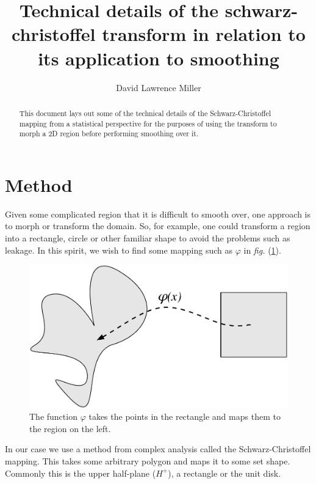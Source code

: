 \documentclass[a4paper,10pt]{amsart}
\title{Technical details of the schwarz-christoffel transform in relation to its application to smoothing}
\author{David Lawrence Miller}
\newcommand{\sch}{Schwarz-Christoffel }
\newcommand{\fig}[1]{\emph{fig.} (\ref{#1})}
\renewcommand{\phi}{\varphi}
\begin{document}
 
\begin{abstract}
This document lays out some of the technical details of the \sch mapping from a statistical perspective for the purposes of using the transform to morph a 2D region before performing smoothing over it. 
\end{abstract}
 
 
\newtheorem{thm}{Theorem}[section]
 
\newtheorem{defn}{Definition}[section]
 
\maketitle


\section{Method}

Given some complicated region that it is difficult to smooth over, one approach is to morph or transform the domain. So, for example, one could transform a region into a rectangle, circle or other familiar shape to avoid the problems such as leakage. In this spirit, we wish to find some mapping such as $\phi$ in \fig{simpledia}.

\begin{figure} [htbp]
\centering
\includegraphics[scale=0.3]{figs/simpledia.pdf}
\caption{The function $\phi$ takes the points in the rectangle and maps them to the region on the left.}
\label{simpledia}
\end{figure}

In our case we use a method from complex analysis called the \sch mapping. This takes some arbitrary polygon and maps it to some set shape. Commonly this is the upper half-plane ($H^+$), a rectangle or the unit disk. 
\end{document}
